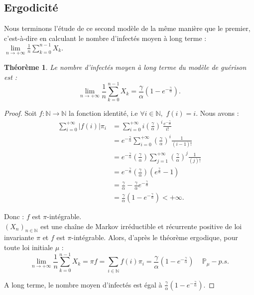 \documentclass[12pt,a4paper]{report}
\newtheorem{thm}{Théorème}[section]
\theoremstyle{remark}
\begin{document}
\subsection{Ergodicité}
\vspace{0.6cm}

Nous terminons l'étude de ce second modèle de la même manière que le premier, c'est-à-dire en calculant le nombre d’infectés moyen à long terme : $\lim\limits_{n \to +\infty} \frac{1}{n} \sum\limits_{k=0}^{n-1} X_k.$
\begin{thm}
Le nombre d’infectés moyen à long terme du modèle de guérison est : $$\lim\limits_{n \to +\infty} \frac{1}{n} \sum\limits_{k=0}^{n-1} X_k =  \frac{\gamma}{\alpha} \left(1 - e^{-\frac{\gamma}{\alpha}}\right).$$
\end{thm}
\begin{proof}
Soit $f : \mathbb{N} \longrightarrow \mathbb{N}$ la fonction identité, i.e $\forall i \in \mathbb{N}, \, \, f(i) = i.$ Nous avons :
\begin{align*}
\sum_{i=0}^{+\infty} |f(i)| \pi_i &= \sum_{i=0}^{+\infty} i \left(\frac{\gamma}{\alpha}\right)^i \frac{e^{-\frac{\gamma}{\alpha}}}{i!} \\
&= e^{-\frac{\gamma}{\alpha}} \sum_{i=0}^{+\infty} \left(\frac{\gamma}{\alpha}\right)^i \frac{1}{(i-1)!} \\
&=  e^{-\frac{\gamma}{\alpha}} \left(\frac{\gamma}{\alpha}\right)  \sum_{j=1}^{+\infty} \left(\frac{\gamma}{\alpha}\right)^j \frac{1}{(j)!} \\
&= e^{-\frac{\gamma}{\alpha}} \left(\frac{\gamma}{\alpha}\right) \left(e^{\frac{\gamma}{\alpha}}
 - 1 \right) \\
&= \frac{\gamma}{\alpha} - \frac{\gamma}{\alpha} e^{-\frac{\gamma}{\alpha}} \\
&= \frac{\gamma}{\alpha} \left(1 - e^{-\frac{\gamma}{\alpha}}\right) < +\infty.
\end{align*}

Donc : $f$ est $\pi$-intégrable.\\

$(X_n)_{n \in \mathbb{N}}$ est une chaîne de Markov irréductible et récurrente positive de loi invariante $\pi$ et $f$ est $\pi$-intégrable. Alors, d’après le théorème ergodique, pour toute loi initiale $\mu$ :
$$\lim\limits_{n \to +\infty} \frac{1}{n} \sum\limits_{k=0}^{n-1} X_k= \pi f = \sum\limits_{i\in\mathbb{N}} f(i)\pi_i=  \frac{\gamma}{\alpha} \left(1 - e^{-\frac{\gamma}{\alpha}}\right) \text{   }\, \, \, \mathbb{P}_{\mu}-p.s.$$

A long terme, le nombre moyen d'infectés est égal à $ \frac{\gamma}{\alpha} \left(1 - e^{-\frac{\gamma}{\alpha}}\right)$.
\end{proof}
\end{document}
